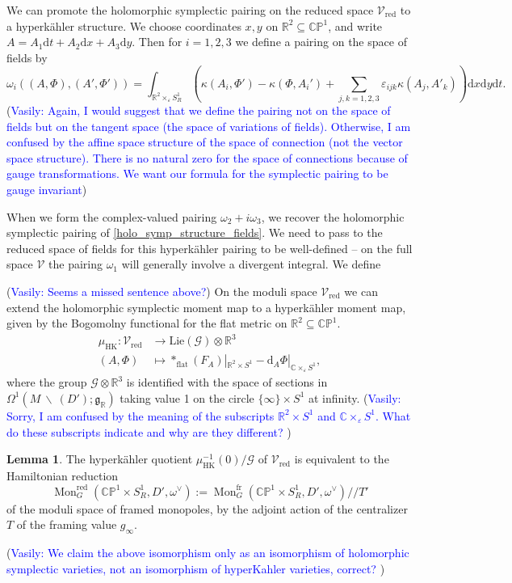 \documentclass[11pt, oneside, reqno]{amsart}
\theoremstyle{definition} \newtheorem{definition}{Definition}[section]
\newtheorem{lemma}[definition]{Lemma}
\theoremstyle{definition} \newtheorem{remark}[definition]{Remark}
\theoremstyle{definition} \newtheorem{remarks}[definition]{Remarks}
\theoremstyle{definition} \newtheorem{question}[definition]{Question}
\theoremstyle{definition} \newtheorem*{note}{Note}
\theoremstyle{definition} \newtheorem{example}[definition]{Example}
\theoremstyle{definition} \newtheorem{examples}[definition]{Examples}
\renewcommand{\gg}{\mathfrak{g}}
\newcommand{\bb}[1]{\mathbb{#1}}
\newcommand{\mr}[1]{\mathrm{#1}}
\newcommand{\mc}[1]{\mathcal{#1}}
\newcommand{\bs}{\ \backslash \ }
\newcommand{\CC}{\mathbb{C}}
\newcommand{\RR}{\mathbb{R}}
\newcommand{\eps}{\varepsilon}
\newcommand{\sub}{\subseteq}
\DeclareMathOperator{\mon}{Mon}
\renewcommand{\d}{\mathrm{d}}
\newcommand{\fr}{\mathrm{fr}}
\newcommand{\vasily}[1]{(\textcolor{blue}{Vasily: #1})}
\begin{document}
We can promote the holomorphic symplectic pairing on the reduced space $\mc V_{\mr{red}}$ to a hyperk\"ahler structure.  We choose coordinates $x,y$ on $\RR^2 \sub \bb{CP}^1$, and write $A = A_1 \d t + A_2 \d x + A_3 \d y$.  Then for $i=1,2,3$ we define a pairing on the space of fields by
\begin{equation}
\label{hyperkahler_structure_fields}
\omega_i((A,\Phi),(A',\Phi')) = \int_{\RR^2 \times_\eps S^1_R} \left(\kappa(A_i,\Phi') - \kappa(\Phi, A_i') + \sum_{j,k=1,2,3} \eps_{ijk} \kappa(A_j,A'_k)\right) \d x \d y \d t.
\end{equation}
\vasily{Again, I would suggest that we define the pairing not on the space
  of fields but on the tangent space (the space of variations of fields). Otherwise,
  I am confused by the affine space structure of the space of connection (not
  the vector space structure). There is no natural zero for the space
  of connections because of gauge transformations. We want our formula
  for the symplectic pairing to be gauge invariant}
  
When we form the complex-valued pairing $\omega_2 + i \omega_3$, we recover the holomorphic symplectic pairing of \ref{holo_symp_structure_fields}.  We need to pass to the reduced space of fields for this hyperk\"ahler pairing to be well-defined -- on the full space $\mc V$ the pairing $\omega_1$ will generally involve a divergent integral.  We define 

\vasily{Seems a missed sentence above?} 
On the moduli space $\mc V_{\mr{red}}$ we can extend the holomorphic symplectic moment map to a hyperk\"ahler moment map, given by the Bogomolny functional for the flat metric on $\RR^2 \sub \bb{CP}^1$.  
\begin{align}
\mu_{\mr{HK}} \colon \mc V_{\mr{red}} &\to \mr{Lie}(\mc G) \otimes \RR^3 \\
(A,\Phi) &\mapsto \ast_{\mr{flat}} (F_A)|_{\RR^2 \times S^1}- \d_A \Phi|_{\CC \times_\eps S^1}, \nonumber
\end{align}
where the group $\mc G \otimes \RR^3$ is identified with the space of sections in $\Omega^1(M \bs (D'); \gg_\RR)$ taking value 1 on the circle $\{\infty\} \times S^1$ at infinity.
\vasily{Sorry, I am confused by the meaning of the subscripts ${\RR^2 \times S^1}$ and $\CC \times_\eps S^1$. What do these subscripts indicate and why are they different? } 
  
\begin{lemma}
The hyperk\"ahler quotient $\mu_{\mr{HK}}^{-1}(0)/\mc G$ of $\mc V_{\mr{red}}$ is equivalent to the Hamiltonian reduction 
\[\mon^\mr{red}_G(\bb{CP}^1 \times S^1_R, D', \omega^\vee) := \mon^\fr_G(\bb{CP}^1 \times S^1_R, D', \omega^\vee) /\!/ T'\]
of the moduli space of framed monopoles, by the adjoint action of the centralizer $T$ of the framing value $g_\infty$.
\end{lemma}
\vasily{We claim the above isomorphism only as an isomorphism of holomorphic
  symplectic varieties, not an isomorphism of hyperKahler varieties, correct?
}
\end{document}
